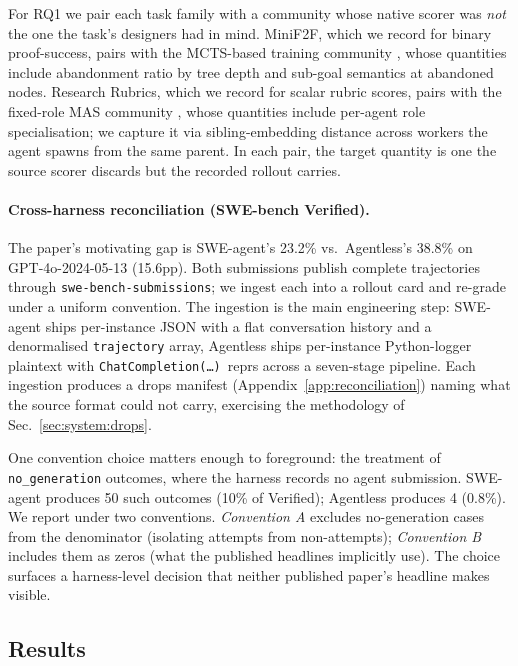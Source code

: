\documentclass{article}
\begin{document}
For RQ1 we pair each task family with a community whose
native scorer was \emph{not} the one the task's designers had
in mind. MiniF2F, which we record for binary proof-success,
pairs with the MCTS-based training community
\citep{rstarmath2025, feng2024restmcts}, whose quantities
include abandonment ratio by tree depth and sub-goal
semantics at abandoned nodes. Research Rubrics, which we
record for scalar rubric scores, pairs with the fixed-role
MAS community \citep{cemri2025mast}, whose quantities include
per-agent role specialisation; we capture it via
sibling-embedding distance across workers the agent spawns
from the same parent. In each pair, the target quantity is
one the source scorer discards but the recorded rollout
carries.

\paragraph{Cross-harness reconciliation (SWE-bench
Verified).} The paper's motivating gap is SWE-agent's 23.2\%
vs.\ Agentless's 38.8\% on GPT-4o-2024-05-13 (15.6pp). Both
submissions publish complete trajectories through
\texttt{swe-bench-submissions}; we ingest each into a rollout
card and re-grade under a uniform convention. The ingestion
is the main engineering step: SWE-agent ships per-instance
JSON with a flat conversation history and a denormalised
\texttt{trajectory} array, Agentless ships per-instance
Python-logger plaintext with
\texttt{ChatCompletion(\ldots)}~reprs across a seven-stage
pipeline. Each ingestion produces a drops manifest
(Appendix~\ref{app:reconciliation}) naming what the source
format could not carry, exercising the methodology of
Sec.~\ref{sec:system:drops}.

One convention choice matters enough to foreground: the
treatment of \texttt{no\_generation} outcomes, where the
harness records no agent submission. SWE-agent produces 50
such outcomes (10\% of Verified); Agentless produces 4
(0.8\%). We report under two conventions.
\emph{Convention A} excludes no-generation cases from the
denominator (isolating attempts from non-attempts);
\emph{Convention B} includes them as zeros (what the
published headlines implicitly use). The choice surfaces a
harness-level decision that neither published paper's
headline makes visible.

\subsection{Results}
\label{sec:validation:results}
\end{document}
